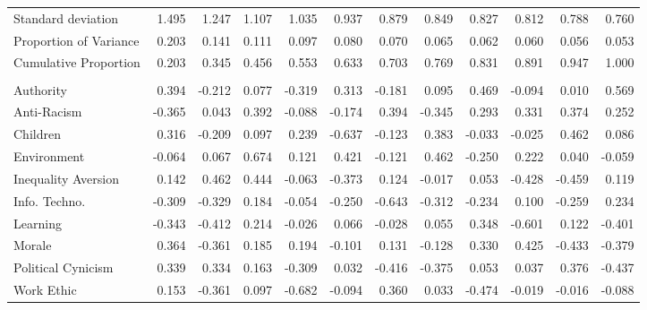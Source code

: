 \begin{tabular}{lrrrrrrrrrrr}
\midrule
\hspace{1em}Standard deviation & 1.495 & 1.247 & 1.107 & 1.035 & 0.937 & 0.879 & 0.849 & 0.827 & 0.812 & 0.788 & 0.760\\
\hspace{1em}Proportion of Variance & 0.203 & 0.141 & 0.111 & 0.097 & 0.080 & 0.070 & 0.065 & 0.062 & 0.060 & 0.056 & 0.053\\
\hspace{1em}Cumulative Proportion & 0.203 & 0.345 & 0.456 & 0.553 & 0.633 & 0.703 & 0.769 & 0.831 & 0.891 & 0.947 & 1.000\\
\addlinespace[0.3em]
\multicolumn{12}{l}{\textbf{NCDS58 - Age 42}}\\
\hline
\hspace{1em}Authority & 0.394 & -0.212 & 0.077 & -0.319 & 0.313 & -0.181 & 0.095 & 0.469 & -0.094 & 0.010 & 0.569\\
\hspace{1em}Anti-Racism & -0.365 & 0.043 & 0.392 & -0.088 & -0.174 & 0.394 & -0.345 & 0.293 & 0.331 & 0.374 & 0.252\\
\hspace{1em}Children & 0.316 & -0.209 & 0.097 & 0.239 & -0.637 & -0.123 & 0.383 & -0.033 & -0.025 & 0.462 & 0.086\\
\hspace{1em}Environment & -0.064 & 0.067 & 0.674 & 0.121 & 0.421 & -0.121 & 0.462 & -0.250 & 0.222 & 0.040 & -0.059\\
\hspace{1em}Inequality Aversion & 0.142 & 0.462 & 0.444 & -0.063 & -0.373 & 0.124 & -0.017 & 0.053 & -0.428 & -0.459 & 0.119\\
\hspace{1em}Info. Techno. & -0.309 & -0.329 & 0.184 & -0.054 & -0.250 & -0.643 & -0.312 & -0.234 & 0.100 & -0.259 & 0.234\\
\hspace{1em}Learning & -0.343 & -0.412 & 0.214 & -0.026 & 0.066 & -0.028 & 0.055 & 0.348 & -0.601 & 0.122 & -0.401\\
\hspace{1em}Morale & 0.364 & -0.361 & 0.185 & 0.194 & -0.101 & 0.131 & -0.128 & 0.330 & 0.425 & -0.433 & -0.379\\
\hspace{1em}Political Cynicism & 0.339 & 0.334 & 0.163 & -0.309 & 0.032 & -0.416 & -0.375 & 0.053 & 0.037 & 0.376 & -0.437\\
\hspace{1em}Work Ethic & 0.153 & -0.361 & 0.097 & -0.682 & -0.094 & 0.360 & 0.033 & -0.474 & -0.019 & -0.016 & -0.088\\

\end{tabular}
